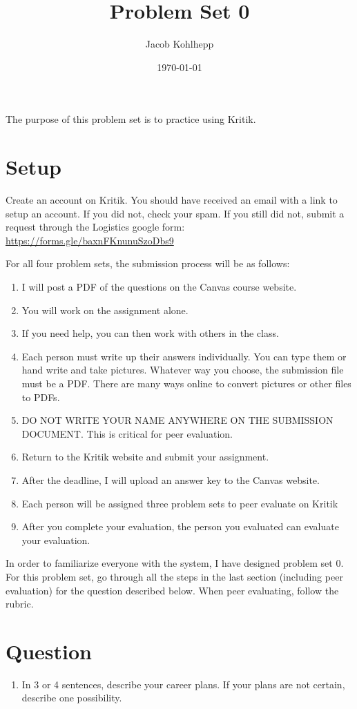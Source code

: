 \documentclass{article}
\title{Problem Set 0}
\author{Jacob Kohlhepp}
\date{\today}
\begin{document}
\maketitle


The purpose of this problem set is to practice using Kritik.

\section{Setup}

Create an account on Kritik. You should have received an email with a link to setup an account. If you did not, check your spam. If you still did not, submit a request through the Logistics google form: \url{https://forms.gle/baxnFKnunuSzoDbs9}

For all four problem sets, the submission process will be as follows:

\begin{enumerate}
    \item I will post a PDF of the questions on the Canvas course website.
    \item You will work on the assignment alone.
    \item If you need help, you can then work with others in the class.
    \item Each person must write up their answers individually. You can type them or hand write and take pictures. Whatever way you choose, the submission file must be a PDF. There are many ways online to convert pictures or other files to PDFs.
    \item DO NOT WRITE YOUR NAME ANYWHERE ON THE SUBMISSION DOCUMENT. This is critical for peer evaluation.
    \item Return to the Kritik website and submit your assignment.
    \item After the deadline, I will upload an answer key to the Canvas website.
    \item Each person will be assigned three problem sets to peer evaluate on Kritik
    \item After you complete your evaluation, the person you evaluated can evaluate your evaluation.
\end{enumerate}

In order to familiarize everyone with the system, I have designed problem set 0. For this problem set, go through all the steps in the last section (including peer evaluation) for the question described below. When peer evaluating, follow the rubric.

\section{Question}

\begin{enumerate}
    \item In 3 or 4 sentences, describe your career plans. If your plans are not certain, describe one possibility.
\end{enumerate}
\end{document}
